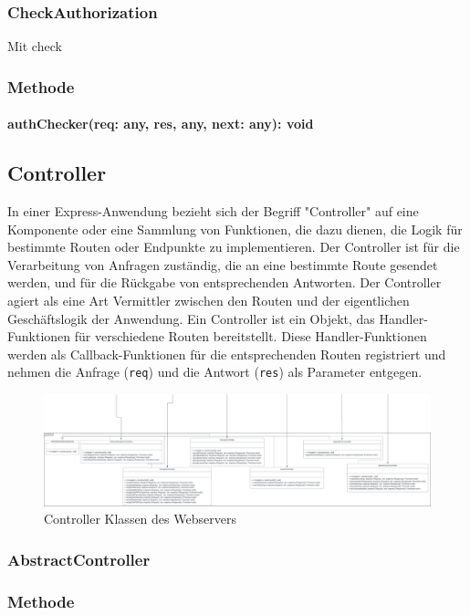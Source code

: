 \documentclass[parskip=full]{scrartcl}
\begin{document}
\subsubsection{CheckAuthorization}
Mit check
\subsubsection*{Methode}
\paragraph{authChecker(req: any, res, any, next: any): void}

\subsection{Controller}
In einer Express-Anwendung bezieht sich der Begriff "Controller" auf eine Komponente oder eine Sammlung von Funktionen, die dazu dienen, die Logik für bestimmte Routen oder Endpunkte zu implementieren.
Der Controller ist für die Verarbeitung von Anfragen zuständig, die an eine bestimmte Route gesendet werden, und für die Rückgabe von entsprechenden Antworten.
Der Controller agiert als eine Art Vermittler zwischen den Routen und der eigentlichen Geschäftslogik der Anwendung.
Ein Controller ist ein Objekt, das Handler-Funktionen für verschiedene Routen bereitstellt.
Diese Handler-Funktionen werden als Callback-Funktionen für die entsprechenden Routen registriert und nehmen die Anfrage (\texttt{req}) und die Antwort (\texttt{res}) als Parameter entgegen.

\begin{figure}[htp]
    \centering
    \includegraphics[width = 1\textwidth]{images/webserver/controller.pdf}
    \caption{Controller Klassen des Webservers}
    \label{fig:controller}
\end{figure}

\subsubsection{AbstractController}
\subsubsection*{Methode}
\end{document}
